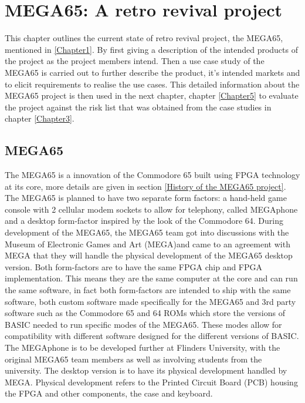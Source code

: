 
\chapter{MEGA65: A retro revival project}
\label{Chapter4}

This chapter outlines the current state of retro revival project, the MEGA65, mentioned in \ref{Chapter1}. By first giving a description of the intended products of the project as the project members intend. Then a use case study of the MEGA65 is carried out to further describe the product, it's intended markets and to elicit requirements to realise the use cases. This detailed information about the MEGA65 project is then used in the next chapter, chapter \ref{Chapter5} to evaluate the project against the risk list that was obtained from the case studies in chapter \ref{Chapter3}.
\section{MEGA65}
The MEGA65 is a innovation of the Commodore 65 built using FPGA technology at its core, more details are given in section \ref{History of the MEGA65 project}. The MEGA65 is planned to have two separate form factors: a hand-held game console with 2 cellular modem sockets to allow for telephony, called MEGAphone and a desktop form-factor inspired by the look of the Commodore 64. During development of the MEGA65, the MEGA65 team got into discussions with the Museum of Electronic Games and Art (MEGA)and came to an agreement with MEGA that they will handle the physical development of the MEGA65 desktop version. Both form-factors are to have the same FPGA chip and FPGA implementation. This means they are the same computer at the core and can run the same software, in fact both form-factors are intended to ship with the same software, both custom software made specifically for the MEGA65 and 3rd party software such as the Commodore 65 and 64 ROMs which store the versions of BASIC needed to run specific modes of the MEGA65. These modes allow for compatibility with different software designed for the different versions of BASIC. The MEGAphone is to be developed further at Flinders University, with the original MEGA65 team members as well as involving students from the university. The desktop version is to have its physical development handled by MEGA. Physical development refers to the Printed Circuit Board (PCB) housing the FPGA and other components, the case and keyboard. 

